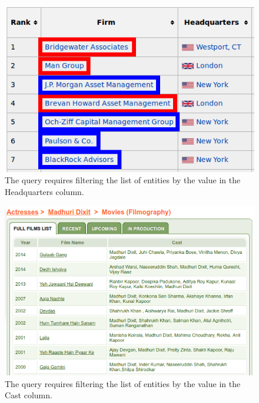 \begin{figure}[tp]
\centering
\includegraphics[scale=0.45]{figures/openweb/incorrect2-hedgefund.png}
\caption[
The query 
requires compositional understanding.
]{The query 
requires filtering the list of entities
by the value in the Headquarters column.}
\label{fig:openweb-hedgefund}
\end{figure}

\begin{figure}[tp]
\centering
\includegraphics[scale=0.45]{figures/openweb/openweb-indian.png}
\caption[
The query 
requires compositional understanding.
]{The query 
requires filtering the list of entities
by the value in the Cast column.}
\label{fig:openweb-indian}
\end{figure}

